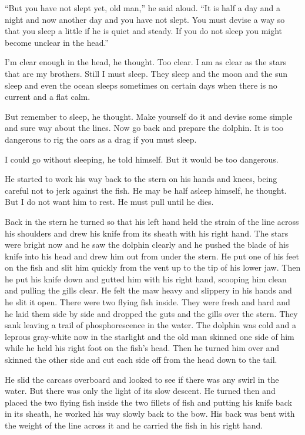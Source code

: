 ``But you have not slept yet, old man,'' he said aloud. ``It is half a day
and a night and now another day and you have not slept. You must
\gls{devise} a way so that you sleep a little if he is quiet and steady. If
you do not sleep you might become unclear in the head.''

I'm clear enough in the head, he thought. Too clear. I am as clear as the
stars that are my brothers. Still I must sleep. They sleep and the moon and
the sun sleep and even the ocean sleeps sometimes on certain days when there
is no current and a flat calm.

But remember to sleep, he thought. Make yourself do it and devise some
simple and sure way about the lines. Now go back and prepare the dolphin. It
is too dangerous to \gls{rig} the oars as a drag if you must sleep.

I could go without sleeping, he told himself. But it would be too dangerous.

He started to work his way back to the stern on his hands and knees, being
careful not to jerk against the fish. He may be half asleep himself, he
thought. But I do not want him to rest. He must pull until he dies.

Back in the stern he turned so that his left hand held the strain of the
line across his shoulders and drew his knife from its sheath with his right
hand. The stars were bright now and he saw the dolphin clearly and he pushed
the blade of his knife into his head and drew him out from under the stern.
He put one of his feet on the fish and \gls{slit} him quickly from the
\gls{vent} up to the \gls{tip} of his lower jaw. Then he put his knife down
and \gls{gutted} him with his right hand, scooping him clean and pulling the
\glspl{gill} clear. He felt the \gls{maw} heavy and \gls{slippery} in his
hands and he slit it open. There were two flying fish inside. They were
fresh and hard and he laid them side by side and dropped the guts and the
gills over the stern. They \gls{sank} leaving a trail of phosphorescence in
the water. The dolphin was cold and a \gls{leprous} gray-white now in the
starlight and the old man skinned one side of him while he held his right
foot on the fish's head. Then he turned him over and skinned the other side
and cut each side off from the head down to the tail.

He slid the carcass overboard and looked to see if there was any swirl in
the water. But there was only the light of its slow \gls{descent}. He turned
then and placed the two flying fish inside the two \glspl{fillet} of fish
and putting his knife back in its sheath, he worked his way slowly back to
the bow. His back was \gls{bent} with the weight of the line across it and
he carried the fish in his right hand.

